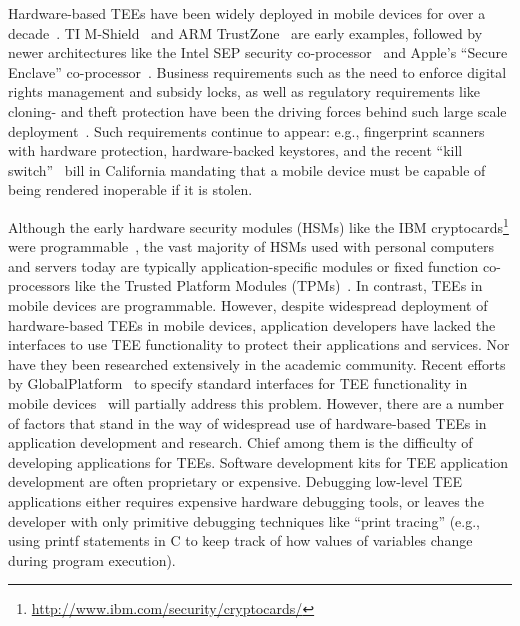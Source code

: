 \documentclass[10pt,conference,letterpaper]{IEEEtran}
\begin{document}
Hardware-based TEEs have been widely deployed in mobile devices for over a decade~\cite{EkbergKA14}. TI M-Shield~\cite{white:mshield} and ARM TrustZone~\cite{web:TRUSTZONE,web:ARM_TZ} are early examples, followed by newer architectures like the Intel SEP security co-processor~\cite{web:SEP} and Apple's ``Secure Enclave'' co-processor~\cite{web:APPLE_SE}. Business requirements such as the need to enforce digital rights management and subsidy locks, as well as regulatory requirements like cloning- and theft protection have been the driving forces behind such large scale deployment~\cite{EkbergKA14}. Such requirements continue to appear: e.g., fingerprint scanners with hardware protection, hardware-backed keystores, and the recent ``kill switch''~\cite{web:SB962} bill in California mandating that a mobile device must be capable of being rendered inoperable if it is stolen.


Although the early hardware security modules (HSMs) like the IBM cryptocards\footnote{\url{http://www.ibm.com/security/cryptocards/}} were programmable~\cite{Dyer+01}, the vast majority of HSMs used with personal computers and servers today are typically application-specific modules or fixed function co-processors like the Trusted Platform Modules (TPMs)~\cite{TPM}. In contrast, TEEs in mobile devices are programmable. However, despite widespread deployment of hardware-based TEEs in mobile devices, application developers have lacked the interfaces to use TEE functionality to protect their applications and services. Nor have they been researched extensively in the academic community.  Recent efforts by GlobalPlatform~\cite{web:GP} to specify standard interfaces for TEE functionality in mobile devices~\cite{web:GP_TEE} will partially address this problem. However, there are a number of factors that stand in the way of widespread use of hardware-based TEEs in application development and research. Chief among them is the difficulty of developing applications for TEEs. Software development kits for TEE application development are often proprietary or expensive. Debugging low-level TEE applications either requires expensive hardware debugging tools, or leaves the developer with only primitive debugging techniques like ``print tracing'' (e.g., using printf statements in C to keep track of how values of variables change during program execution).  
\end{document}
